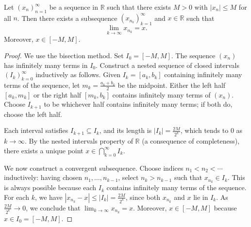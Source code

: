 \begin{theorem} \label{theorem:bolzano_weierstrass_theorem_for_bounded_sequences_in_real_numbers}
    Let $(x_n)_{n=1}^\infty$ be a sequence in $\mathbb{R}$ such that there exists $M > 0$ with $|x_n| \leq M$ for all $n$. Then there exists a subsequence $(x_{n_k})_{k=1}^\infty$ and $x \in \mathbb{R}$ such that
    $$\lim_{k \to \infty} x_{n_k} = x.$$
     Moreover, $x \in [-M, M]$.
\end{theorem}

\begin{proof}
    We use the bisection method. Set $I_0 = [-M, M]$. The sequence $(x_n)$ has infinitely many terms in $I_0$. Construct a nested sequence of closed intervals $(I_k)_{k=0}^\infty$ inductively as follows. Given $I_k = [a_k, b_k]$ containing infinitely many terms of the sequence, let $m_k = \frac{a_k + b_k}{2}$ be the midpoint. Either the left half $[a_k, m_k]$ or the right half $[m_k, b_k]$ contains infinitely many terms of $(x_n)$. Choose $I_{k+1}$ to be whichever half contains infinitely many terms; if both do, choose the left half.

    Each interval satisfies $I_{k+1} \subseteq I_k$, and its length is $|I_k| = \frac{2M}{2^k}$, which tends to $0$ as $k \to \infty$. By the nested intervals property of $\mathbb{R}$ (a consequence of completeness), there exists a unique point $x \in \bigcap_{k=0}^\infty I_k$.

    We now construct a convergent subsequence. Choose indices $n_1 < n_2 < \cdots$ inductively: having chosen $n_1, \ldots, n_{k-1}$, select $n_k > n_{k-1}$ such that $x_{n_k} \in I_k$. This is always possible because each $I_k$ contains infinitely many terms of the sequence. For each $k$, we have $|x_{n_k} - x| \leq |I_k| = \frac{2M}{2^k}$, since both $x_{n_k}$ and $x$ lie in $I_k$. As $\frac{2M}{2^k} \to 0$, we conclude that $\lim_{k \to \infty} x_{n_k} = x$. Moreover, $x \in [-M, M]$ because $x \in I_0 = [-M, M]$.
\end{proof}
